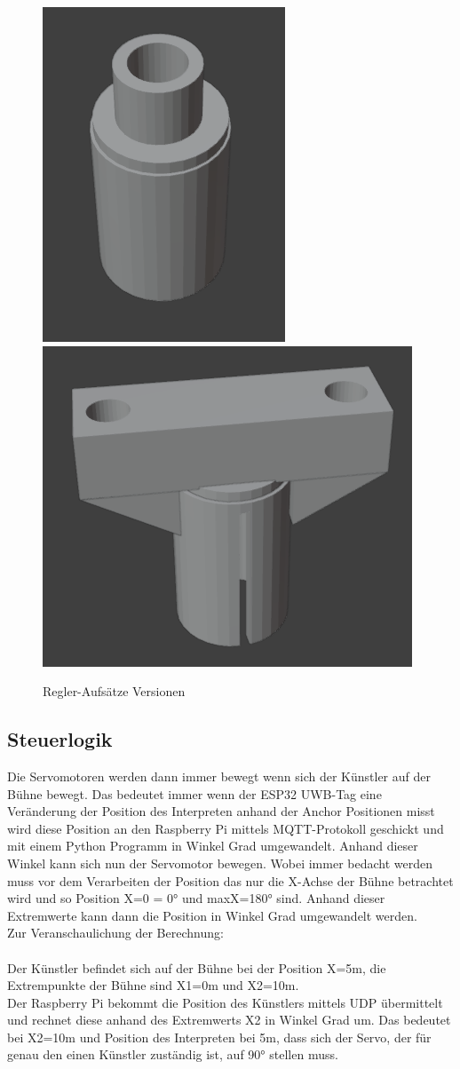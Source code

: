 \begin{figure}[H]
	\centering
	\includegraphics[width=0.189\linewidth]{images/ReglerV1.png}
	\includegraphics[width=0.3\linewidth]{images/Regler.png}
	\caption[Regler-Aufsätze Versionen]{Regler-Aufsätze Versionen}
	\label{fig:Regler-Aufsätze Versionen}
\end{figure}

\subsection{Steuerlogik} \label{Steuerlogik}
Die Servomotoren werden dann immer bewegt wenn sich der Künstler auf der Bühne bewegt. Das bedeutet immer wenn der ESP32 UWB-Tag eine Veränderung der Position des Interpreten anhand der Anchor Positionen misst wird diese Position an den Raspberry Pi mittels MQTT-Protokoll geschickt und mit einem Python Programm in Winkel Grad umgewandelt. Anhand dieser Winkel kann sich nun der Servomotor bewegen. Wobei immer bedacht werden muss vor dem Verarbeiten der Position das nur die X-Achse der Bühne betrachtet wird und so Position X=0 = 0° und maxX=180° sind. Anhand dieser Extremwerte kann dann die Position in Winkel Grad umgewandelt werden.
\\Zur Veranschaulichung der Berechnung:\\\\
Der Künstler befindet sich auf der Bühne bei der Position X=5m, die Extrempunkte der Bühne sind X1=0m und X2=10m.\\
Der Raspberry Pi bekommt die Position des Künstlers mittels UDP übermittelt und rechnet diese anhand des Extremwerts X2 in Winkel Grad um. Das bedeutet bei X2=10m und Position des Interpreten bei 5m, dass sich der Servo, der für genau den einen Künstler zuständig ist, auf 90° stellen muss. \\

